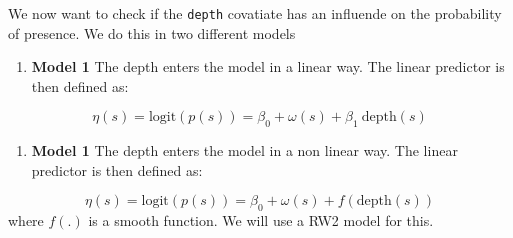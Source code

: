 \documentclass[
  letterpaper,
  DIV=11,
  numbers=noendperiod]{scrartcl}
\providecommand{\tightlist}{%
  \setlength{\itemsep}{0pt}\setlength{\parskip}{0pt}}\usepackage{longtable,booktabs,array}
\begin{document}
We now want to check if the \texttt{depth} covatiate has an influende on
the probability of presence. We do this in two different models

\begin{enumerate}
\def\labelenumi{\arabic{enumi}.}
\tightlist
\item
  \textbf{Model 1} The depth enters the model in a linear way. The
  linear predictor is then defined as:
\end{enumerate}

\[
  \eta(s) = \text{logit}(p(s)) = \beta_0 + \omega(s) + \beta_1\ \text{depth}(s)
\]

\begin{enumerate}
\def\labelenumi{\arabic{enumi}.}
\setcounter{enumi}{1}
\tightlist
\item
  \textbf{Model 1} The depth enters the model in a non linear way. The
  linear predictor is then defined as:
\end{enumerate}

\[
  \eta(s) = \text{logit}(p(s)) = \beta_0 + \omega(s) +  f(\text{depth}(s))
\] where \(f(.)\) is a smooth function. We will use a RW2 model for
this.
\end{document}
